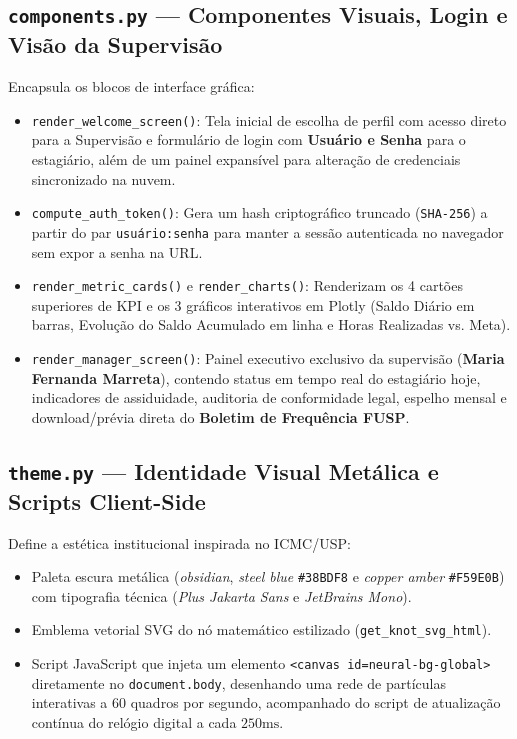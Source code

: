 \documentclass[11pt,a4paper]{article}
\begin{document}
\subsection{\texttt{components.py} --- Componentes Visuais, Login e Visão da Supervisão}
Encapsula os blocos de interface gráfica:
\begin{itemize}[leftmargin=1.5em]
    \item \texttt{render\_welcome\_screen()}: Tela inicial de escolha de perfil com acesso direto para a Supervisão e formulário de login com \textbf{Usuário e Senha} para o estagiário, além de um painel expansível para alteração de credenciais sincronizado na nuvem.
    \item \texttt{compute\_auth\_token()}: Gera um hash criptográfico truncado (\texttt{SHA-256}) a partir do par \texttt{usuário:senha} para manter a sessão autenticada no navegador sem expor a senha na URL.
    \item \texttt{render\_metric\_cards()} e \texttt{render\_charts()}: Renderizam os 4 cartões superiores de KPI e os 3 gráficos interativos em Plotly (Saldo Diário em barras, Evolução do Saldo Acumulado em linha e Horas Realizadas vs. Meta).
    \item \texttt{render\_manager\_screen()}: Painel executivo exclusivo da supervisão (\textbf{Maria Fernanda Marreta}), contendo status em tempo real do estagiário hoje, indicadores de assiduidade, auditoria de conformidade legal, espelho mensal e download/prévia direta do \textbf{Boletim de Frequência FUSP}.
\end{itemize}

\subsection{\texttt{theme.py} --- Identidade Visual Metálica e Scripts Client-Side}
Define a estética institucional inspirada no ICMC/USP:
\begin{itemize}[leftmargin=1.5em]
    \item Paleta escura metálica (\textit{obsidian}, \textit{steel blue} \texttt{\#38BDF8} e \textit{copper amber} \texttt{\#F59E0B}) com tipografia técnica (\textit{Plus Jakarta Sans} e \textit{JetBrains Mono}).
    \item Emblema vetorial SVG do nó matemático estilizado (\texttt{get\_knot\_svg\_html}).
    \item Script JavaScript que injeta um elemento \texttt{<canvas id=\textquotesingle neural-bg-global\textquotesingle >} diretamente no \texttt{document.body}, desenhando uma rede de partículas interativas a 60 quadros por segundo, acompanhado do script de atualização contínua do relógio digital a cada $250\text{ms}$.
\end{itemize}
\end{document}

